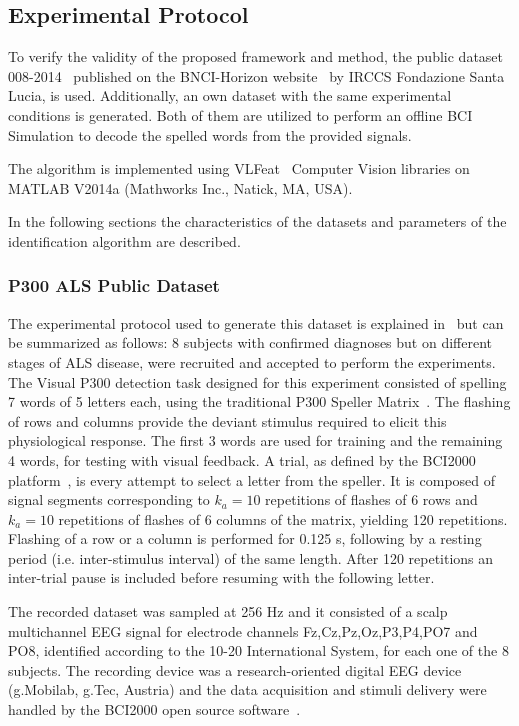 \documentclass[utf8]{frontiersSCNS} %
\begin{document}
\subsection{Experimental Protocol} \label{Protocol}

To verify the validity of the proposed framework and method, the public dataset 008-2014~\citep{Riccio2013} published on the BNCI-Horizon website~\citep{Brunner2014} by  IRCCS Fondazione Santa Lucia, is used. Additionally, an own dataset with  the same experimental conditions is generated. Both of them are utilized to perform an offline BCI Simulation to decode the spelled words from the provided signals. 

The algorithm is implemented using  VLFeat~\citep{Vedaldi2010} Computer Vision libraries on MATLAB V2014a (Mathworks Inc., Natick, MA, USA). 

In the following sections the characteristics of the datasets and parameters of the identification algorithm are described. 

\subsubsection{P300 ALS Public Dataset} \label{ALSDataset}

The experimental protocol used to generate this dataset is explained in~\citep{Riccio2013} but can be summarized as follows:  8 subjects with confirmed diagnoses but on different stages of ALS disease, were recruited and accepted to perform the experiments. The Visual P300 detection task designed for this experiment consisted of spelling 7 words of 5 letters each, using the traditional P300 Speller Matrix~\citep{Farwell1988}. The flashing of rows and columns provide the deviant stimulus required to elicit this physiological response.  The first 3 words are used for training and the remaining 4 words, for testing with visual feedback.  A trial, as defined by the BCI2000 platform~\citep{Schalk2004}, is every attempt to select a letter from the speller. It is composed of signal segments corresponding to $k_a =10$ repetitions of flashes of 6 rows and $k_a =10$ repetitions of flashes of 6 columns of the matrix, yielding 120 repetitions.  Flashing of a row or a column is performed for 0.125 s, following by a resting period (i.e. inter-stimulus interval) of the same length.  After 120 repetitions an inter-trial pause is included before resuming with the following letter.

The recorded dataset was sampled at 256 Hz and it consisted of a scalp multichannel EEG signal for electrode channels Fz,Cz,Pz,Oz,P3,P4,PO7 and PO8, identified according to the 10-20 International System,  for each one of the 8 subjects.   The recording device was a research-oriented digital EEG device (g.Mobilab, g.Tec, Austria) and the data acquisition and stimuli delivery were handled by the BCI2000 open source software~\citep{Schalk2004}.
\end{document}
